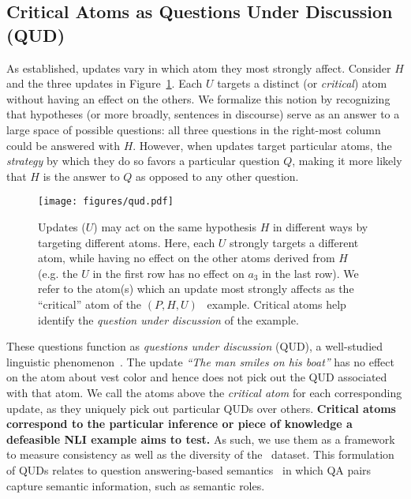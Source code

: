 \subsection{Critical Atoms as Questions Under Discussion (QUD)}
\label{subsec:quds}

As established, updates vary in which atom they most strongly affect.
%
Consider $H$ and the three updates in Figure~\ref{fig:qud-examples}.
%
Each $U$ targets a distinct (or \textit{critical}) atom without having an effect on the others.
%
We formalize this notion by recognizing that hypotheses (or more broadly, sentences in discourse) serve as an answer to a large space of possible questions: all three questions in the right-most column could be answered with $H$.
%
However, when updates target particular atoms, the \textit{strategy} by which they do so favors a particular question $Q$, making it more likely that $H$ is the answer to $Q$ as opposed to any other question.


\begin{figure}[h!]
\centering
\texttt{[image: figures/qud.pdf]}
\caption{Updates ($U$) may act on the same hypothesis $H$ in different ways by targeting different atoms. Here, each $U$ strongly targets a different atom, while having no effect on the other atoms derived from $H$ (e.g. the $U$ in the first row has no effect on $a_3$ in the last row). We refer to the atom(s) which an update most strongly affects as the ``critical'' atom of the $(P, H, U)$ \dnli~example. Critical atoms help identify the \textit{question under discussion} of the example.}
\label{fig:qud-examples}
\end{figure}

\noindent These questions function as \textit{questions under discussion} (QUD), a well-studied linguistic phenomenon~\cite{benz2017questions}. 
%
The update \textit{``The man smiles on his boat''} has no effect on the atom about vest color and hence does not pick out the QUD associated with that atom.
%
We call the atoms above the \textit{critical atom} for each corresponding update, as they uniquely pick out particular QUDs over others.
%
\textbf{Critical atoms correspond to the particular inference or piece of knowledge a defeasible NLI example aims to test.}
%
As such, we use them as a framework to measure consistency as well as the diversity of the \dsnli~dataset.
%
This formulation of QUDs relates to question answering-based semantics~\cite{he-etal-2015-question, pyatkin-etal-2021-asking, klein-etal-2022-qasem} in which QA pairs capture semantic information, such as semantic roles.

